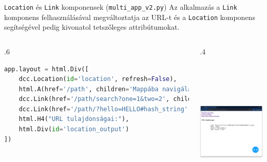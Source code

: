 \documentclass[english, aspectratio=169]{beamer}
\begin{document}
\begin{frame}[fragile]{\texttt{Location} és \texttt{Link} komponensek (\texttt{multi\_app\_v2.py})}
	Az alkalmazás a \texttt{Link} komponens felhasználásával megváltoztatja az URL-t és a \texttt{Location} komponens segítségével pedig kivonatol tetszőleges attribútumokat.
	\begin{columns}
		\begin{column}{.6\textwidth}
			\begin{lstlisting}[language=python]
app.layout = html.Div([
	dcc.Location(id='location', refresh=False),
	html.A(href='/path', children='Mappába navigálás'),
	dcc.Link(href='/path/search?one=1&two=2', children='Keresés indítása'),
	dcc.Link(href='/path/?hello=HELLO#hash_string', children='Hash alapú oldalra navigálás'),
	html.H4("URL tulajdonságai:"),
	html.Div(id='location_output')
])
			\end{lstlisting}
		\end{column}
		\begin{column}{.4\textwidth}
			\begin{center}
				\includegraphics[width=6cm, height=7cm, keepaspectratio]{images/adv_6.png}
			\end{center}
		\end{column}
	\end{columns}
\end{frame}
\end{document}
